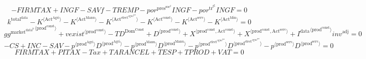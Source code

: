 \begin{equation}
-{F\!I\!R\!M\!T\!A\!X} + {I\!N\!G\!F} - {S\!A\!V\!f} - {T\!R\!E\!M\!P} - {{p\!o\!r}^{\mathrm{pres}^{\mathrm{soc}^{\mathrm{f}}}}} {{I\!N\!G\!F}} - {{p\!o\!r}^{\mathrm{tr}^{\mathrm{f}^{\mathrm{g}}}}} {{I\!N\!G\!F}} = 0
\end{equation}
\begin{equation}
k^{\mathrm{total}^{\mathrm{data}}} - {K}^{\langle \mathrm{Act}^{\mathrm{Agri}}\rangle} - {K}^{\langle \mathrm{Act}^{\mathrm{Manu}}\rangle} - {K}^{\langle \mathrm{Act}^{\mathrm{elect}^{\mathrm{agua}^{\mathrm{gas}}}}\rangle} - {K}^{\langle \mathrm{Act}^{\mathrm{const}}\rangle} - {K}^{\langle \mathrm{Act}^{\mathrm{serv}}\rangle} - {K}^{\langle \mathrm{Act}^{\mathrm{Min}}\rangle} = 0
\end{equation}
\begin{equation}
{{g\!g}^{\mathrm{market}^{\mathrm{data}^{\mathrm{p}}}}}^{\langle \mathrm{\mathrm{prod}^{\mathrm{const}}}\rangle} + {{v\!e\!x\!i\!s\!t}}^{\langle \mathrm{\mathrm{prod}^{\mathrm{const}}}\rangle} - {T\!D}^{\mathrm{Dom}^{\mathrm{Const}}} + {D}^{\langle \mathrm{prod}^{\mathrm{const}}\rangle} + {X}^{\langle \mathrm{prod}^{\mathrm{const}},\mathrm{Act}^{\mathrm{const}}\rangle} + {X}^{\langle \mathrm{prod}^{\mathrm{const}},\mathrm{Act}^{\mathrm{serv}}\rangle} + {{I^{\mathrm{data}}}^{\langle \mathrm{\mathrm{prod}^{\mathrm{const}}}\rangle}} {{i\!n\!v}^{\mathrm{adj}}} = 0
\end{equation}
\begin{equation}
-{C\!S} + {I\!N\!C} - {S\!A\!V} - {{p}^{\langle \mathrm{prod}^{\mathrm{Agri}}\rangle}} {{D}^{\langle \mathrm{prod}^{\mathrm{Agri}}\rangle}} - {{p}^{\langle \mathrm{prod}^{\mathrm{Manu}}\rangle}} {{D}^{\langle \mathrm{prod}^{\mathrm{Manu}}\rangle}} - {{p}^{\langle \mathrm{prod}^{\mathrm{elect}^{\mathrm{agua}^{\mathrm{gas}}}}\rangle}} {{D}^{\langle \mathrm{prod}^{\mathrm{elect}^{\mathrm{agua}^{\mathrm{gas}}}}\rangle}} - {{p}^{\langle \mathrm{prod}^{\mathrm{serv}}\rangle}} {{D}^{\langle \mathrm{prod}^{\mathrm{serv}}\rangle}} = 0
\end{equation}
\begin{equation}
{F\!I\!R\!M\!T\!A\!X} + {P\!I\!T\!A\!X} - {T\!a\!x} + {T\!A\!R\!A\!N\!C\!E\!L} + {T\!E\!S\!P} + {T\!P\!R\!O\!D} + {V\!A\!T} = 0
\end{equation}
